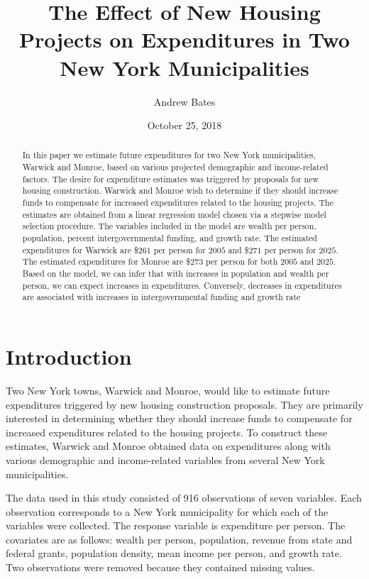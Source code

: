 \documentclass{article}\usepackage[]{graphicx}\usepackage[]{color}
\title{The Effect of New Housing Projects on Expenditures in Two New York Municipalities}
\author{Andrew Bates}
\date{October 25, 2018}
\begin{document}
 
\maketitle

\begin{abstract}
In this paper we estimate future expenditures for two New York municipalities, Warwick and Monroe, based on various projected demographic and income-related factors. The desire for expenditure estimates was triggered by proposals for new housing construction. Warwick and Monroe wish to determine if they should increase funds to compensate for increased expenditures related to the housing projects. The estimates are obtained from a linear regression model chosen via a stepwise model selection procedure. The variables included in the model are wealth per person, population, percent intergovernmental funding, and growth rate. The estimated expenditures for Warwick are \$$261$ per person for $2005$ and \$$271$ per person for $2025$. The estimated expenditures for Monroe are \$$273$ per person for both $2005$ and $2025$. Based on the model, we can infer that with increases in population and wealth per person, we can expect increases in expenditures. Conversely, decreases in expenditures are associated with increases in intergovernmental funding and growth rate
\end{abstract}


\section{Introduction} \label{intro}

Two New York towns, Warwick and Monroe, would like to estimate future expenditures triggered by new housing construction proposals. They are primarily interested in determining whether they should increase funds to compensate for increased expenditures related to the housing projects. To construct these estimates, Warwick and Monroe obtained data on expenditures along with various demographic and income-related variables from several New York municipalities. 


The data used in this study consisted of 916 observations of seven variables. Each observation corresponds to a New York municipality for which each of the variables were collected. The response variable is expenditure per person. The covariates are as follows: wealth per person, population, revenue from state and federal grants, population density, mean income per person, and growth rate. Two observations were removed because they contained missing values.
\end{document}
